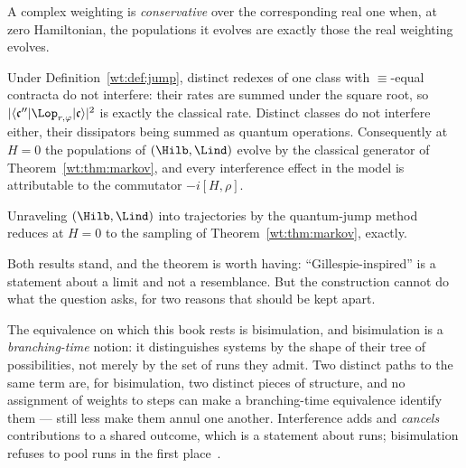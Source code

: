\begin{definition}[Conservativity]
\label{def:conservativity}
A complex weighting is \emph{conservative} over the corresponding real one
when, at zero Hamiltonian, the populations it evolves are exactly those
the real weighting evolves.
\end{definition}

\begin{proposition}
\label{wt:prop:interference}
Under Definition~\ref{wt:def:jump}, distinct redexes of one class with
$\equiv$-equal contracta do not interfere: their rates are summed under the
square root, so $|\langle\mathfrak{c}''|\Lop_{r,\varphi}|\mathfrak{c}\rangle|^2$
is exactly the classical rate.  Distinct classes do not interfere either,
their dissipators being summed as quantum operations.  Consequently at
$H = 0$ the populations of $(\Hilb,\Lind)$ evolve by the classical generator
of Theorem~\ref{wt:thm:markov}, and every interference effect in the model
is attributable to the commutator $-i[H,\rho]$.
\end{proposition}

\begin{theorem}[The Gillespie algorithm is the quantum jump at $H = 0$]
\label{wt:thm:degeneration}
Unraveling $(\Hilb,\Lind)$ into trajectories by the quantum-jump method
reduces at $H = 0$ to the sampling of Theorem~\ref{wt:thm:markov}, exactly.
\end{theorem}

Both results stand, and the theorem is worth having: ``Gillespie-inspired''
is a statement about a limit and not a resemblance.  But the construction
cannot do what the question asks, for two reasons that should be kept apart.

\begin{remark}
\label{rmk:obstruction}
The equivalence on which this book rests is bisimulation, and bisimulation
is a \emph{branching-time} notion: it distinguishes systems by the shape of
their tree of possibilities, not merely by the set of runs they admit.  Two
distinct paths to the same term are, for bisimulation, two distinct pieces
of structure, and no assignment of weights to steps can make a
branching-time equivalence identify them --- still less make them annul one
another.  Interference adds and \emph{cancels} contributions to a shared
outcome, which is a statement about runs; bisimulation refuses to pool runs
in the first place~\cite[\S13]{CE}.
\end{remark}

